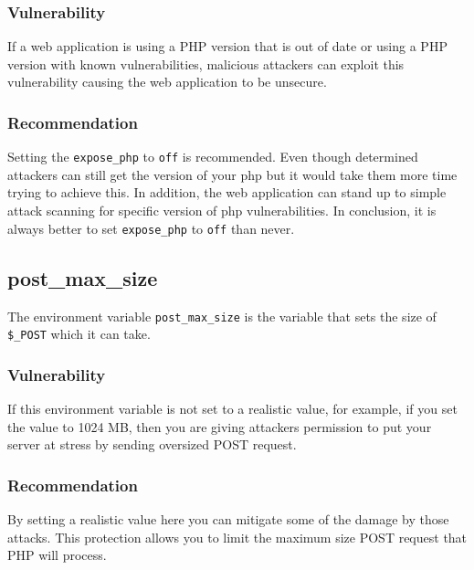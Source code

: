 \documentclass[conference]{IEEEtran}
\begin{document}
\subsubsection{Vulnerability}
If a web application is using a PHP version that is out of date or using a PHP version with known vulnerabilities, malicious attackers can exploit this vulnerability causing the web application to be 
unsecure\cite{exposephp}.

\subsubsection{Recommendation}
Setting the \texttt{expose\_php} to \texttt{off} is recommended. Even though determined attackers can still get the version of your php but it would take them more time trying to achieve this. In addition,
 the web application can stand up to simple attack scanning for specific version of php vulnerabilities. In conclusion, it is always better to set \texttt{expose\_php} to \texttt{off} than never.
 
\subsection{post\_max\_size}
The environment variable \texttt{post\_max\_size} is the variable that sets the size of \texttt{\$\_POST} which it can take.
\subsubsection{Vulnerability}
If this environment variable is not set to a realistic value, for example, if you set the value to 1024 MB, then you are giving attackers permission to put your server at stress by sending oversized POST request.\cite{postmaxsize}
\subsubsection{Recommendation}
By setting a realistic value here you can mitigate some of the damage by those attacks. This protection allows you to limit the maximum size POST request that PHP will process.
\end{document}
